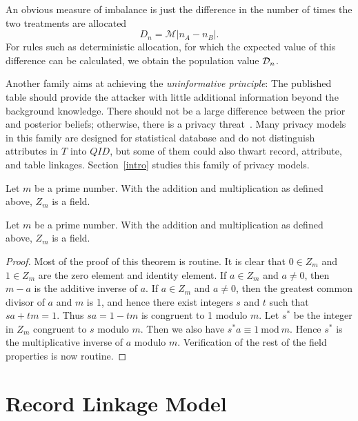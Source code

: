 An obvious measure of imbalance is just the difference in the
number of times the two treatments are allocated
\begin{equation}
D_n = \mathcal{M}|n_A - n_B|. \label{2deffD}
\end{equation}
For rules such as deterministic allocation, for which the expected
value of this difference can be calculated, we obtain the population
value ${\cal D}_n$.

\begin{shortbox}
Another family aims at achieving the \emph{uninformative principle}: The published table should provide the attacker with little additional information beyond the background knowledge. There should not be a large difference between the prior and posterior beliefs; otherwise, there is a privacy threat~\cite{jain2004ass, jolliffe2002pca}. Many privacy models in this family are designed for statistical database and do not distinguish attributes in $T$ into $QID$, but some of them could also thwart record, attribute, and table linkages. Section~\ref{intro} studies this family of privacy models.

Let $m$ be a prime number. With the addition and multiplication as
defined above, $Z_m$ is a field.
\end{shortbox}

\begin{theorem}\label{1th:Z_m}
Let $m$ be a prime number. With the addition and multiplication as
defined above, $Z_m$ is a field.
\end{theorem}

\begin{proof}
Most of the proof of this theorem is routine.  It is clear that $0\in Z_m$
and $1\in Z_m$ are the
zero element and identity element. If $a\in Z_m$ and $a\ne 0$, then $m-a$
is the additive inverse of $a$. If $a\in Z_m$ and $a\ne 0$, then the
greatest common divisor of $a$ and $m$ is 1, and hence
there exist integers $s$ and $t$ such that $sa+tm=1$. Thus $sa=1 -tm$ is
congruent to 1 modulo $m$. Let $s^*$ be the integer in $Z_m$
congruent to $s$
modulo $m$. Then we also have $s^*a\equiv 1\  \mbox{mod}\ m$. Hence $s^*$
is
the multiplicative inverse of $a$ modulo $m$. Verification of the rest of
the field properties is now routine.\end{proof}



\section{Record Linkage Model}\label{sec:reclinkage}

